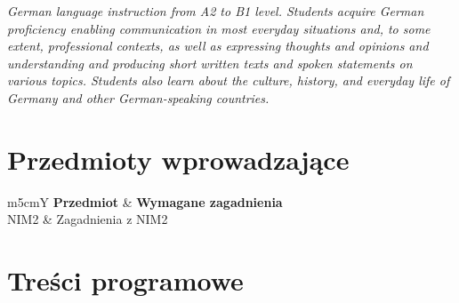 \documentclass[12pt, a4paper]{article}
\newcommand{\thdrule}{\noalign{\global\setlength{\extrarowheight}{0pt}}}
\newcommand{\thdend}{\noalign{\global\setlength{\extrarowheight}{3pt}}}
\begin{document}
\textit{German language instruction from A2 to B1 level. Students acquire German proficiency enabling communication in most everyday situations and, to some extent, professional contexts, as well as expressing thoughts and opinions and understanding and producing short written texts and spoken statements on various topics. Students also learn about the culture, history, and everyday life of Germany and other German-speaking countries.}


\section{Przedmioty wprowadzające}

{\scriptsize
\begin{tabularx}{\textwidth}{m{5cm}Y}
\thdrule\toprule
{} {\color{white}\textbf{Przedmiot}} & {\color{white}\textbf{Wymagane zagadnienia}} \\
\midrule\thdend
   NIM2 & Zagadnienia z NIM2 \\
\bottomrule
\end{tabularx}}

\section{Treści programowe}
\end{document}
